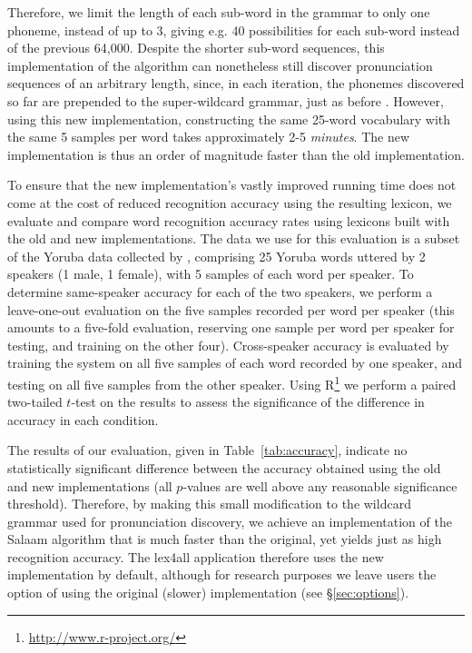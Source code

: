 \documentclass[11pt]{article}
\begin{document}
Therefore, we limit the length of each sub-word in the grammar to only one phoneme, instead of up to 3, giving e.g. 40 possibilities for each sub-word instead of the previous 64,000. Despite the shorter sub-word sequences, this implementation of the algorithm can nonetheless still discover pronunciation sequences of an arbitrary length, since, in each iteration, the phonemes discovered so far are prepended to the super-wildcard grammar, just as before \cite[p.~4]{Qiao10}. However, using this new implementation, constructing the same 25-word vocabulary with the same 5 samples per word takes approximately 2-5 \textit{minutes}. The new implementation is thus an order of magnitude faster than the old implementation.

To ensure that the new implementation's vastly improved running time does not come at the cost of reduced recognition accuracy using the resulting lexicon, we evaluate and compare word recognition accuracy rates using lexicons built with the old and new implementations. The data we use for this evaluation is a subset of the Yoruba data collected by , comprising 25 Yoruba words uttered by 2 speakers (1 male, 1 female), with 5 samples of each word per speaker. 
To determine same-speaker accuracy for each of the two speakers, we perform a leave-one-out evaluation on the five samples recorded per word per speaker (this amounts to a five-fold evaluation, reserving one sample per word per speaker for testing, and training on the other four). Cross-speaker accuracy is evaluated by training the system on all five samples of each word recorded by one speaker, and testing on all five samples from the other speaker.
Using R\footnote{\url{http://www.r-project.org/}} we perform a paired two-tailed $t$-test on the results to assess the significance of the difference in accuracy in each condition.

The results of our evaluation, given in Table~\ref{tab:accuracy}, indicate no statistically significant difference between the accuracy obtained using the old and new implementations (all $p$-values are well above any reasonable significance threshold). Therefore, by making this small modification to the wildcard grammar used for pronunciation discovery, we achieve an implementation of the Salaam algorithm that is much faster than the original, yet yields just as high recognition accuracy. The lex4all application therefore uses the new implementation by default, although for research purposes we leave users the option of using the original (slower) implementation (see \S\ref{sec:options}).
\end{document}
